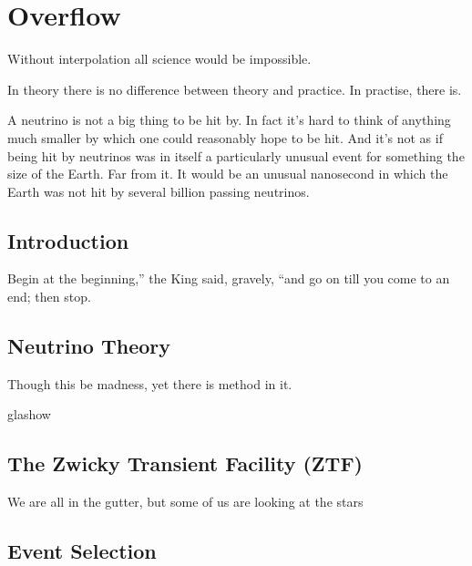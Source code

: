 \setchapterpreamble[u]{\margintoc}
\chapter{Overflow}
\begin{fquote} Without interpolation all science would be impossible. 
\end{fquote}
\begin{fquote} In theory there is no difference between theory and practice. In practise, there is.
\end{fquote}
\begin{fquote} A neutrino is not a big thing to be hit by. In fact it's hard to think of anything much smaller by which one could reasonably hope to be hit. And it's not as if being hit by neutrinos was in itself a particularly unusual event for something the size of the Earth. Far from it. It would be an unusual nanosecond in which the Earth was not hit by several billion passing neutrinos.
\end{fquote}
\section{Introduction}
\begin{fquote}Begin at the beginning,'' the King said, gravely, ``and go on till you come to an end; then stop.
\end{fquote}
\section{Neutrino Theory}
\begin{fquote} Though this be madness, yet there is method in it.
\end{fquote}
glashow
\section{The Zwicky Transient Facility (ZTF)}
\begin{fquote}We are all in the gutter, but some of us are looking at the stars
\end{fquote}

\section{Event Selection}

